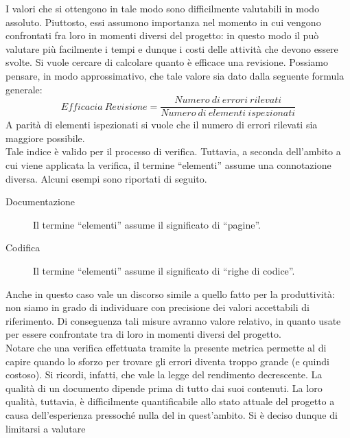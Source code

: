 				I valori che si ottengono in tale modo sono difficilmente valutabili in modo assoluto. Piuttosto, essi assumono importanza nel 
				momento in cui vengono confrontati fra loro in momenti diversi del progetto: in questo modo il  può valutare 
				più facilmente i tempi e dunque i costi delle attività che devono essere svolte.
			 \label{subsec:effRevisione}
				Si vuole cercare di calcolare quanto è efficace una revisione. Possiamo pensare, in modo approssimativo, che tale valore sia dato 
				dalla seguente formula generale:
				\begin{equation} \label{eq:efficaciarevisione}
					Efficacia\ Revisione = \frac{Numero\ di\ errori\ rilevati}{Numero\ di\ elementi\ ispezionati}
				\end{equation}
				A parità di elementi ispezionati si vuole che il numero di errori rilevati sia maggiore possibile.\\
				Tale indice è valido per il processo di verifica. Tuttavia, a seconda dell'ambito a cui viene applicata la verifica, il termine 
				“elementi” assume una connotazione diversa. Alcuni esempi sono riportati di seguito.
				\begin{description}
					\item[Documentazione] Il termine “elementi” assume il significato di “pagine”.
					\item[Codifica] Il termine “elementi” assume il significato di “righe di codice”.
				\end{description}
				Anche in questo caso vale un discorso simile a quello fatto per la produttività: non siamo in grado di individuare con 
				precisione dei valori accettabili di riferimento. Di conseguenza tali misure avranno valore relativo, in quanto usate per essere 
				confrontate tra di loro in momenti diversi del progetto.\\
				Notare che una verifica effettuata tramite la presente metrica permette al  di capire quando lo sforzo per 
				trovare gli errori diventa troppo grande (e quindi costoso). Si ricordi, infatti, che vale la legge del rendimento decrescente.
				La qualità di un documento dipende prima di tutto dai suoi contenuti. La loro qualità, tuttavia, è difficilmente quantificabile allo 
				stato attuale del progetto a causa dell'esperienza pressoché nulla del  in quest'ambito. Si è deciso dunque di limitarsi a valutare 
